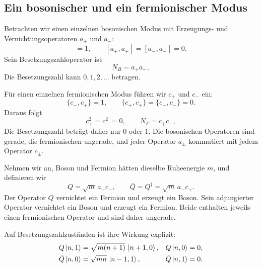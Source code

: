 \subsection{Ein bosonischer und ein fermionischer Modus}

Betrachten wir einen einzelnen bosonischen Modus mit Erzeugungs- und Vernichtungsoperatoren \(a_+\) und \(a_-\):
\begin{equation}
[a_-,a_+]=1,
\qquad
[a_+,a_+]=[a_-,a_-]=0.
\end{equation}
Sein Besetzungszahloperator ist
\begin{equation}
N_B=a_+a_-,
\end{equation}
Die Besetzungszahl kann \(0,1,2,\ldots\) betragen.

Für einen einzelnen fermionischen Modus führen wir \(c_+\) und \(c_-\) ein:
\begin{equation}
\{c_-,c_+\}=1,
\qquad
\{c_+,c_+\}=\{c_-,c_-\}=0.
\end{equation}
Daraus folgt
\begin{equation}
c_+^2=c_-^2=0,
\qquad
N_F=c_+c_-,
\end{equation}
Die Besetzungszahl beträgt daher nur \(0\) oder \(1\). Die bosonischen Operatoren sind gerade, die fermionischen ungerade, und jeder Operator \(a_\pm\) kommutiert mit jedem Operator \(c_\pm\).


Nehmen wir an, Boson und Fermion hätten dieselbe Ruheenergie \(m\), und definieren wir
\begin{equation}
Q=\sqrt m\,a_+c_-,
\qquad
\bar Q=Q^\dagger=\sqrt m\,a_-c_+.
\end{equation}
Der Operator \(Q\) vernichtet ein Fermion und erzeugt ein Boson. Sein adjungierter Operator vernichtet ein Boson und erzeugt ein Fermion. Beide enthalten jeweils einen fermionischen Operator und sind daher ungerade.

Auf Besetzungszahlzuständen ist ihre Wirkung explizit:
\begin{align}
Q\left\lvert n,1\right\rangle
&=\sqrt{m(n+1)}\,\left\lvert n+1,0\right\rangle,
&
Q\left\lvert n,0\right\rangle&=0,\\
\bar Q\left\lvert n,0\right\rangle
&=\sqrt{mn}\,\left\lvert n-1,1\right\rangle,
&
\bar Q\left\lvert n,1\right\rangle&=0.
\end{align}

